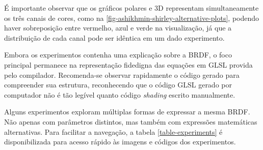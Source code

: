 É importante observar que os gráficos polares e 3D representam simultaneamente os três canais de cores, como na \autoref{fig-ashikhmin-shirley-alternative-plots}, podendo haver sobreposição entre vermelho, azul e verde na visualização, já que a distribuição de cada canal pode ser idêntica em um dado experimento.

Embora os experimentos contenha uma explicação sobre a BRDF, o foco principal permanece na representação fidedigna das equações em GLSL provida pelo compilador. Recomenda-se observar rapidamente o código gerado para compreender sua estrutura, reconhecendo que o código GLSL gerado por computador não é tão legível quanto código \textit{shading} escrito manualmente.

Alguns experimentos exploram múltiplas formas de expressar a mesma BRDF. Não apenas com parâmetros distintos, mas também com expressões matemáticas alternativas. Para facilitar a navegação, a tabela \autoref{table-experiments} é disponibilizada para acesso rápido às imagens e códigos dos experimentos.



